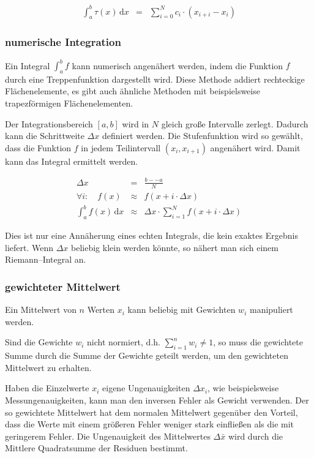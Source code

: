 \documentclass[12pt,a4paper]{scrartcl}
\numberwithin{equation}{section} %
\begin{document}
\begin{eqnarray}
    \int_a^b\tau(x)\,\mathrm dx
        &=& \sum_{i=0}^N c_i\cdot (x_{i+i}-x_i)
\end{eqnarray}

\hypertarget{numerische-integration}{%
\subsubsection{numerische Integration}\label{numerische-integration}}

Ein Integral $\int_a^b f$ kann numerisch angenähert werden, indem die Funktion $f$ durch eine Treppenfunktion dargestellt wird. Diese Methode addiert rechteckige Flächenelemente, es gibt auch ähnliche Methoden mit beispielsweise trapezförmigen Flächenelementen.

Der Integrationsbereich $[a,b]$ wird in $N$ gleich große Intervalle zerlegt. Dadurch kann die Schrittweite $\Delta x$ definiert werden. Die Stufenfunktion wird so gewählt, dass die Funktion $f$ in jedem Teilintervall $(x_i, x_{i+1})$ angenähert wird. Damit kann das Integral ermittelt werden.

\begin{eqnarray}
    \Delta x &=& \frac{b--a}{N} \\
    \forall i:\quad
        f(x) &\approx& f(x+i\cdot\Delta x) \\
    \int_a^b f(x) \,\mathrm dx
        &\approx& \Delta x\cdot
            \sum_{i=1}^N f(x + i\cdot \Delta x)
\end{eqnarray}

\noindent
Dies ist nur eine Annäherung eines echten Integrals, die kein exaktes Ergebnis liefert. Wenn $\Delta x$ beliebig klein werden könnte, so nähert man sich einem Riemann--Integral an.

\hypertarget{gewichteter-mittelwert}{%
\subsubsection{gewichteter Mittelwert}\label{gewichteter-mittelwert}}

Ein Mittelwert von $n$ Werten $x_i$ kann beliebig mit Gewichten $w_i$ manipuliert werden.

Sind die Gewichte $w_i$ nicht normiert, d.h. $\sum_{i=1}^n w_i\neq 1$, so muss die gewichtete Summe durch die Summe der Gewichte geteilt werden, um den gewichteten Mittelwert zu erhalten.

Haben die Einzelwerte $x_i$ eigene Ungenauigkeiten $\Delta x_i$, wie beispielsweise Messungenauigkeiten, kann man den inversen Fehler als Gewicht verwenden. Der so gewichtete Mittelwert hat dem normalen Mittelwert gegenüber den Vorteil, dass die Werte mit einem größeren Fehler weniger stark einfließen als die mit geringerem Fehler. Die Ungenauigkeit des Mittelwertes $\Delta \bar x$ wird durch die Mittlere Quadratsumme der Residuen bestimmt.
\end{document}
